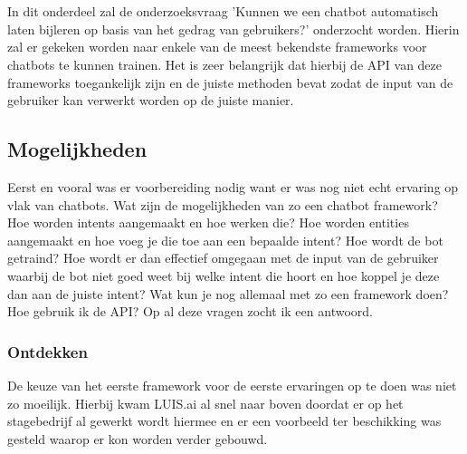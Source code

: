 
\chapter{}
\label{ch:methodologie}


In dit onderdeel zal de onderzoeksvraag 'Kunnen we een chatbot automatisch laten bijleren op basis van het gedrag van gebruikers?' onderzocht worden. Hierin zal er gekeken worden naar enkele van de meest bekendste frameworks voor chatbots te kunnen trainen. Het is zeer belangrijk dat hierbij de API van deze frameworks toegankelijk zijn en de juiste methoden bevat zodat de input van de gebruiker kan verwerkt worden op de juiste manier.

\section{Mogelijkheden}
\label{sec:Mogelijkheden}

Eerst en vooral was er voorbereiding nodig want er was nog niet echt ervaring op vlak van chatbots. Wat zijn de mogelijkheden van zo een chatbot framework? Hoe worden intents aangemaakt en hoe werken die? Hoe worden entities aangemaakt en hoe voeg je die toe aan een bepaalde intent? Hoe wordt de bot getraind? Hoe wordt er dan effectief omgegaan met de input van de gebruiker waarbij de bot niet goed weet bij welke intent die hoort en hoe koppel je deze dan aan de juiste intent? Wat kun je nog allemaal met zo een framework doen? Hoe gebruik ik de API? Op al deze vragen zocht ik een antwoord.

\subsection{Ontdekken}
\label{Ontdekken}

De keuze van het eerste framework voor de eerste ervaringen op te doen was niet zo moeilijk. Hierbij kwam LUIS.ai al snel naar boven doordat er op het stagebedrijf al gewerkt wordt hiermee en er een voorbeeld ter beschikking was gesteld waarop er kon worden verder gebouwd.

